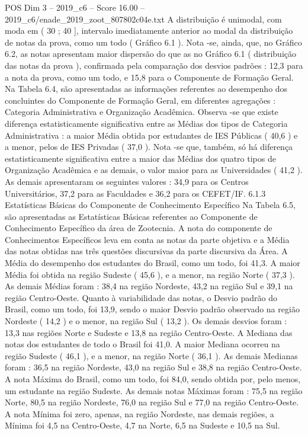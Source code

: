 \begin{textsample}{POS Dim 3 – 2019\_c6 – Score 16.00 – 2019\_c6/enade\_2019\_zoot\_807802c04e.txt}
A distribuição é unimodal, com moda em ( 30 ; 40 ], intervalo imediatamente anterior ao modal da distribuição de notas da prova, como um todo ( Gráfico 6.1 ).
Nota -se, ainda, que, no Gráfico 6.2, as notas apresentam maior dispersão do que as no Gráfico 6.1 ( distribuição das notas da prova ), confirmada pela comparação dos desvios padrões : 12,3 para a nota da prova, como um todo, e 15,8 para o Componente de Formação Geral.
Na Tabela 6.4, são apresentadas as informações referentes ao desempenho dos concluintes do Componente de Formação Geral, em diferentes agregações : Categoria Administrativa e Organização Acadêmica.
Observa -se que existe diferença estatisticamente significativa entre as Médias dos tipos de Categoria Administrativa : a maior Média obtida por estudantes de IES Públicas ( 40,6 ) e a menor, pelos de IES Privadas ( 37,0 ).
Nota -se que, também, só há diferença estatisticamente significativa entre a maior das Médias dos quatro tipos de Organização Acadêmica e as demais, o valor maior para as Universidades ( 41,2 ).
As demais apresentaram os seguintes valores : 34,9 para os Centros Universitários, 37,2 para as Faculdades e 36,2 para os CEFET/IF. 6.1.3 Estatísticas Básicas do Componente de Conhecimento Específico Na Tabela 6.5, são apresentadas as Estatísticas Básicas referentes ao Componente de Conhecimento Específico da área de Zootecnia.
A nota do componente de Conhecimentos Específicos leva em conta as notas da parte objetiva e a Média das notas obtidas nas três questões discursivas da parte discursiva da Área.
A Média do desempenho dos estudantes do Brasil, como um todo, foi 41,3.
A maior Média foi obtida na região Sudeste ( 45,6 ), e a menor, na região Norte ( 37,3 ).
As demais Médias foram : 38,4 na região Nordeste, 43,2 na região Sul e 39,1 na região Centro-Oeste.
Quanto à variabilidade das notas, o Desvio padrão do Brasil, como um todo, foi 13,9, sendo o maior Desvio padrão observado na região Nordeste ( 14,2 ) e o menor, na região Sul ( 13,2 ).
Os demais desvios foram : 13,3 nas regiões Norte e Sudeste e 13,8 na região Centro-Oeste.
A Mediana das notas dos estudantes de todo o Brasil foi 41,0.
A maior Mediana ocorreu na região Sudeste ( 46,1 ), e a menor, na região Norte ( 36,1 ).
As demais Medianas foram : 36,5 na região Nordeste, 43,0 na região Sul e 38,8 na região Centro-Oeste.
A nota Máxima do Brasil, como um todo, foi 84,0, sendo obtida por, pelo menos, um estudante na região Sudeste.
As demais notas Máximas foram : 75,5 na região Norte, 80,5 na região Nordeste, 76,0 na região Sul e 77,0 na região Centro-Oeste.
A nota Mínima foi zero, apenas, na região Nordeste, nas demais regiões, a Mínima foi 4,5 na Centro-Oeste, 4,7 na Norte, 6,5 na Sudeste e 10,5 na Sul.

\end{textsample}
